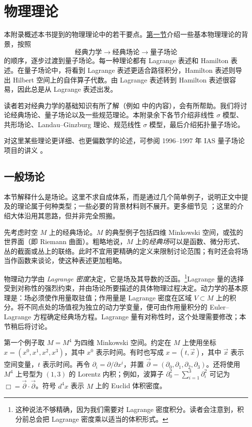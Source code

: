 \chapter{物理理论}\label{app:physical-theories}
本附录概述本书提到的物理理论中的若干要点。\hyperref[sec:general-field-theories]{第一节}介绍一些基本物理理论的背景，按照
\[
\text{经典力学}\longrightarrow\text{经典场论}\longrightarrow\text{量子场论}
\]
的顺序，逐步过渡到量子场论。每一种理论都有 Lagrange 表述和 Hamilton 表述。在量子场论中，将看到 Lagrange 表述更适合路径积分，Hamilton 表述则导出 Hilbert 空间上的自伴算子代数。由 Lagrange 表述转到 Hamilton 表述很容易，因此总是从 Lagrange 表述出发。

读者若对经典力学的基础知识有所了解（例如  中的内容），会有所帮助。我们将讨论经典场论、量子场论以及一些规范理论。本附录余下各节介绍非线性 $\sigma$ 模型、共形场论、Landau--Ginzburg 理论、规范线性 $\sigma$ 模型，最后介绍拓扑量子场论。

对这里某些理论更详细、也更偏数学的论述，可参阅 1996--1997 年 IAS 量子场论项目的讲义 。

\section{一般场论}\label{sec:general-field-theories}
本节解释什么是场论。这里不求自成体系，而是通过几个简单例子，说明正文中提及的理论属于何种类型；一些必要的背景材料则不展开。更多细节见 ；这里的介绍大体沿用其思路，但并非完全照搬。

先考虑时空 $M$ 上的经典场论。$M$ 的典型例子包括四维 Minkowski 空间，或弦的世界面（即 Riemann 曲面）。粗略地说，$M$ 上的\emph{经典场}可以是函数、微分形式、丛的截面或丛上的联络。此时不宜用更精确的定义来限制讨论范围；有时还会将场当作函数来谈论，使这种表述更加粗略。

物理动力学由 \emph{Lagrange 密度}决定，它是场及其导数的泛函。\footnote{这种说法不够精确，因为我们需要对 Lagrange 密度积分。读者会注意到，积分前总会把 Lagrange 密度乘以适当的体积形式。}Lagrange 量的选择受到对称性的强烈约束，并由场论所要描述的具体物理过程决定。动力学的基本原理是：场必须使作用量取驻值；作用量是
Lagrange 密度在区域 $V\subset M$ 上的积分。将不同点处的场值视为独立的动力学变量，便可由作用量积分的 Euler--Lagrange 方程确定经典场方程。Lagrange 量有对称性时，这个处理需要修改；本节稍后将讨论。

第一个例子取 $M=M^4$ 为四维 Minkowski 空间。约定在 $M$ 上使用坐标 $x=(x^0,x^1,x^2,x^3)$，其中 $x^0$ 表示时间。有时也写成 $x=(t,\vec x)$，其中 $\vec x$ 表示空间变量，$t$ 表示时间。再令 $\partial_i=\partial/\partial x^i$，并置 $\vec\partial=(\partial_0,\partial_1,\partial_2,\partial_3)$。还将使用 $M^4$ 上号型为 $(1,3)$ 的 Lorentz 内积；例如，波算子 $\partial_0^2-\sum_{i=1}^3\partial_i^2$ 可记为 $\Box=\vec\partial\cdot\vec\partial$。符号 $d^4x$ 表示 $M$ 上的 Euclid 体积密度。

